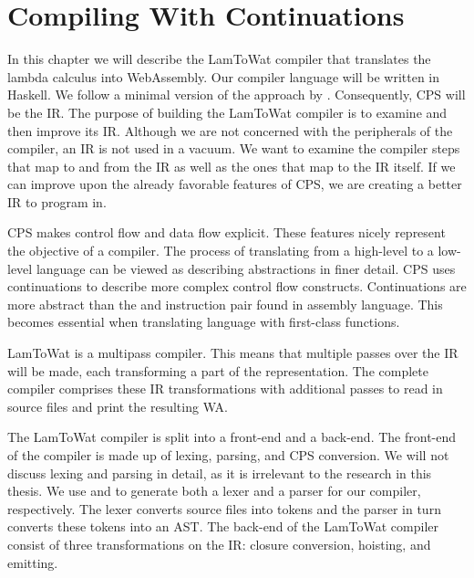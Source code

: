 
\chapter{\label{chap:cpscomp}Compiling With Continuations}
In this chapter we will describe the LamToWat compiler that translates the lambda calculus into WebAssembly. Our compiler language will be written in Haskell. We follow a minimal version of the approach by \citeauthor{DBLP:books/daglib/0022396}. Consequently, \ac{CPS} will be the \ac{IR}. The purpose of building the LamToWat compiler is to examine and then improve its \ac{IR}. Although we are not concerned with the peripherals of the compiler, an \ac{IR} is not used in a vacuum. We want to examine the compiler steps that map to and from the \ac{IR} as well as the ones that map to the \ac{IR} itself. If we can improve upon the already favorable features of \ac{CPS}, we are creating a better IR to program in.

\ac{CPS} makes control flow and data flow explicit. These features nicely represent the objective of a compiler. The process of translating from a high-level to a low-level language can be viewed as describing abstractions in finer detail. \ac{CPS} uses continuations to describe more complex control flow constructs. Continuations are more abstract than the  and  instruction pair found in assembly language. This becomes essential when translating language with first-class functions.

LamToWat is a multipass compiler. This means that multiple passes over the \ac{IR} will be made, each transforming a part of the representation. The complete compiler comprises these \ac{IR} transformations with additional passes to read in source files and print the resulting \ac{WA}.


The LamToWat compiler is split into a front-end and a back-end. The front-end of the compiler is made up of lexing, parsing, and \ac{CPS} conversion. We will not discuss lexing and parsing in detail, as it is irrelevant to the research in this thesis. We use \autocite{haskellalex} and \autocite{haskellhappy} to generate both a lexer and a parser for our compiler, respectively. The lexer converts source files into tokens and the parser in turn converts these tokens into an \ac{AST}. The back-end of the LamToWat compiler consist of three transformations on the \ac{IR}: closure conversion, hoisting, and emitting.


